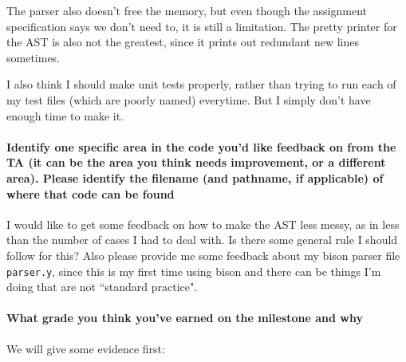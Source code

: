 \documentclass{article}
\begin{document}
The parser also doesn't free the memory, but even though the assignment specification says we don't need to, it is still a limitation. The pretty printer for the AST is also not the greatest, since it prints out redundant new lines sometimes.

I also think I should make unit tests properly, rather than trying to run each of my test files (which are poorly named) everytime. But I simply don't have enough time to make it.

\paragraph{Identify one specific area in the code you'd like feedback on from the TA (it can be the area you think needs improvement, or a different area). Please identify the filename (and pathname, if applicable) of where that code can be found}
    I would like to get some feedback on how to make the AST less messy, as in less than the number of cases I had to deal with. Is there some general rule I should follow for this?
    Also please provide me some feedback about my bison parser file \verb|parser.y|, since this is my first time using bison and there can be things I'm doing that are not ``standard practice".

\paragraph{What grade you think you've earned on the milestone and why}
We will give some evidence first:
\end{document}

